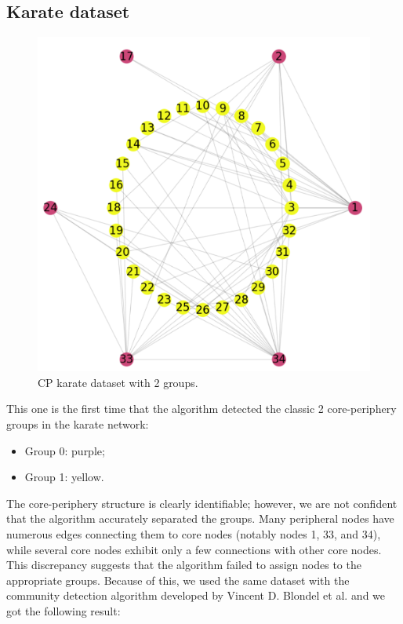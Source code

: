 \documentclass[sigconf]{acmart}
\begin{document}
\subsection{Karate dataset}
\FloatBarrier
\begin{figure}[h]
    \centering
    \includegraphics[width=0.95\linewidth, height=0.95\linewidth]{Img/karate 2 groups.png}
    \caption{CP karate dataset with 2 groups.}
    \label{fig:general cp}
\end{figure}
\FloatBarrier
\noindent This one is the first time that the algorithm detected the classic 2 core-periphery groups in the karate network:
\begin{itemize}
    \item Group 0: purple;
    \item Group 1: yellow.
\end{itemize}
The core-periphery structure is clearly identifiable; however, we are not confident that the algorithm accurately separated the groups. Many peripheral nodes have numerous edges connecting them to core nodes (notably nodes 1, 33, and 34), while several core nodes exhibit only a few connections with other core nodes. This discrepancy suggests that the algorithm failed to assign nodes to the appropriate groups.
Because of this, we used the same dataset with the community detection algorithm developed by Vincent D. Blondel et al. \cite{Community_detection} and we got the following result:
\end{document}
